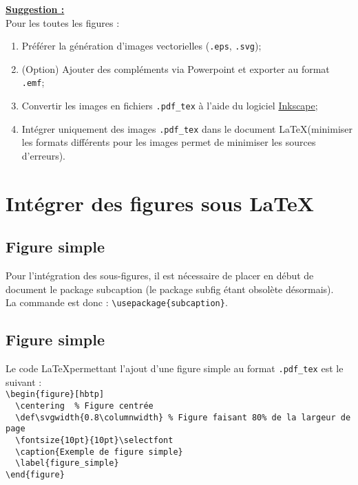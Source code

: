 \documentclass[a4paper,12pt]{report}
\begin{document}
\underline{\textbf{Suggestion :}} \\
Pour les toutes les figures :
\begin{enumerate}
\item Préférer la génération d'images vectorielles (\verb|.eps|, \verb|.svg|);
\item (Option) Ajouter des compléments via Powerpoint et exporter au format \verb|.emf|;
\item Convertir les images en fichiers \verb|.pdf_tex| à l'aide du logiciel \href{https://inkscape.org/fr/}{Inkscape};
\item Intégrer uniquement des images \verb|.pdf_tex| dans le document \LaTeX (minimiser les formats différents pour les images permet de minimiser les sources d'erreurs).
\end{enumerate}



\section{Intégrer des figures sous \LaTeX}
\subsection{Figure simple}
Pour l'intégration des sous-figures, il est nécessaire de placer en début de document le package subcaption (le package subfig étant obsolète désormais). \\
La commande est donc : \verb|\usepackage{subcaption}|.

\subsection{Figure simple}
Le code \LaTeX permettant l'ajout d'une figure simple au format \verb|.pdf_tex| est le suivant : \\

\verb|\begin{figure}[hbtp]	| \\
\verb|	\centering 	% Figure centrée| \\
\verb|	\def\svgwidth{0.8\columnwidth} % Figure faisant 80% de la largeur de page | \\
\verb|	\fontsize{10pt}{10pt}\selectfont | \\
\verb|	\caption{Exemple de figure simple} | \\
\verb|	\label{figure_simple} | \\
\verb|\end{figure} | \\
\end{document}
